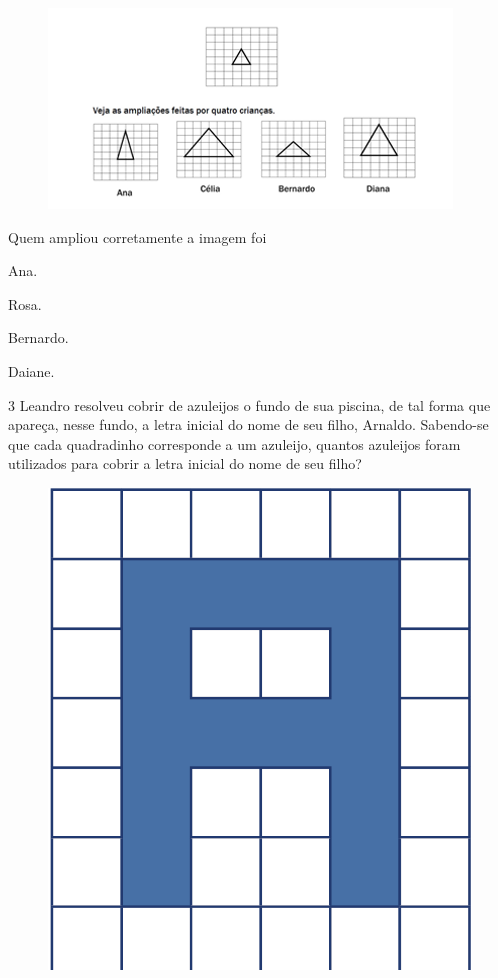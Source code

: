\begin{figure}[htpb!]
\centering
\includegraphics[width=\textwidth]{./imgs/mat5.png}
\end{figure}

Quem ampliou corretamente a imagem foi

\begin{minipage}{.5\textwidth}
\begin{escolha}
\item
  Ana.
\item
  Rosa.
\item
  Bernardo.
\item
  Daiane.
\end{escolha}
\end{minipage}

\pagebreak
\num{3} Leandro resolveu cobrir de azuleijos o fundo de sua piscina, de tal
forma que apareça, nesse fundo, a letra inicial do nome de seu filho,
Arnaldo. Sabendo-se que cada quadradinho corresponde a um azuleijo,
quantos azuleijos foram utilizados para cobrir a letra inicial do nome
de seu filho?

\begin{figure}[htpb!]
\centering
\includegraphics[width=.35\textwidth]{../ilustracoes/MAT5/SAEB_5ANO_MAT_figura37.png}
\end{figure}


